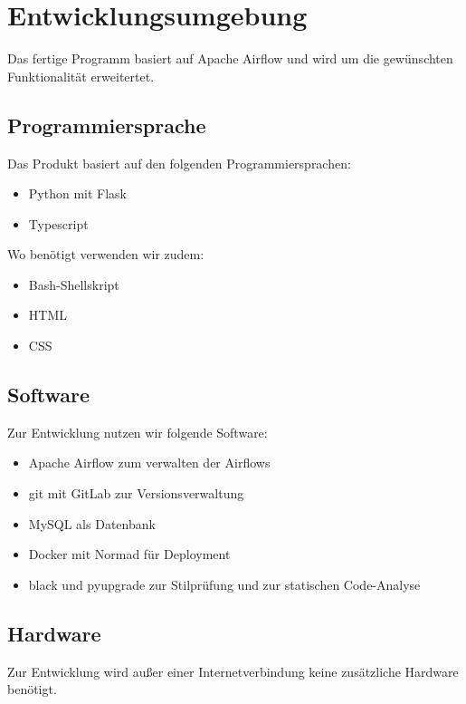 \chapter{Entwicklungsumgebung}
Das fertige Programm basiert auf Apache Airflow und wird um die gewünschten Funktionalität erweitertet.
\section{Programmiersprache}
Das Produkt basiert auf den folgenden Programmiersprachen:
\begin{itemize}
    \setlength\itemsep{-1em}
    \item Python mit Flask
    \item Typescript
\end{itemize}
Wo benötigt verwenden wir zudem:
\begin{itemize}
    \setlength\itemsep{-1em}
    \item Bash-Shellskript 
    \item HTML
    \item CSS
\end{itemize}

\section{Software}
Zur Entwicklung nutzen wir folgende Software:
\begin{itemize}
    \setlength\itemsep{-1em}
    \item Apache Airflow zum verwalten der Airflows
    \item git mit GitLab zur Versionsverwaltung
    \item MySQL als Datenbank
    \item Docker mit Normad für Deployment
    \item black und pyupgrade zur Stilprüfung und zur statischen Code-Analyse
\end{itemize}


\section{Hardware}
Zur Entwicklung wird außer einer Internetverbindung keine zusätzliche Hardware benötigt.